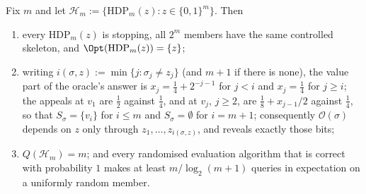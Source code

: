 \begin{theorem}\label{thm:qm-hdp}
Fix $m$ and let $\mathcal H_m:=\{\mathrm{HDP}_m(z):z\in\{0,1\}^m\}$.  Then
\begin{enumerate}[label=(\alph*),leftmargin=2.2em]
\item every $\mathrm{HDP}_m(z)$ is stopping, all $2^{m}$ members have the
      same controlled skeleton, and $\Opt(\mathrm{HDP}_m(z))=\{z\}$;
\item writing $i(\sigma,z):=\min\{j:\sigma_j\ne z_j\}$ (and $m+1$ if there
      is none), the value part of the oracle's answer is
      $x_j=\tfrac14+2^{-j-1}$ for $j<i$ and $x_j=\tfrac14$ for $j\ge i$;
      the appeals at $v_1$ are $\tfrac12$ against $\tfrac14$, and at $v_j$,
      $j\ge2$, are $\tfrac18+x_{j-1}/2$ against $\tfrac14$, so that
      $S_\sigma=\{v_i\}$ for $i\le m$ and $S_\sigma=\emptyset$ for $i=m+1$;
      consequently $\mathcal O(\sigma)$ depends on $z$ only through
      $z_1,\dots,z_{i(\sigma,z)}$, and reveals exactly those bits;
\item $Q(\mathcal H_m)=m$; and every randomised evaluation algorithm that
      is correct with probability $1$ makes at least $m/\log_2(m+1)$
      queries in expectation on a uniformly random member.
\end{enumerate}
\end{theorem}

